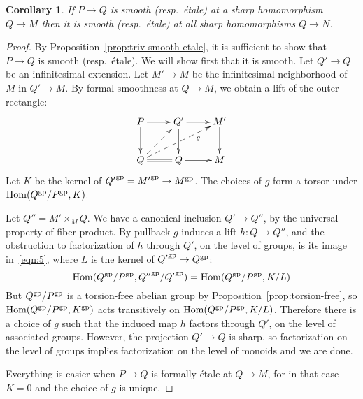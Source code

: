 \documentclass[12pt]{amsart}
\newtheorem{corollary}[theorem]{Corollary}
\theoremstyle{definition}
\theoremstyle{remark}
\def\Hom{\operatorname{Hom}}
\begin{document}
\begin{corollary}
If $P \to Q$ is smooth (resp.\ \'etale) at a sharp homomorphism $Q \to M$ then it is smooth (resp.\ \'etale) at \emph{all} sharp homomorphisms $Q \to N$.
\end{corollary}
\begin{proof}
By Proposition~\ref{prop:triv-smooth-etale}, it is sufficient to show that $P \to Q$ is smooth (resp.\ \'etale).  We will show first that it is smooth.  Let $Q' \to Q$ be an infinitesimal extension.  Let $M' \to M$ be the infinitesimal neighborhood of $M$ in $Q' \to M$.  By formal smoothness at $Q \to M$, we obtain a lift of the outer rectangle:
\begin{equation*} \xymatrix{
P \ar[r] \ar[d] & Q' \ar[r] \ar[d] & M' \ar[d] \\
Q \ar@{-->}[urr]_(.7)g \ar@{-->}[ur] \ar@{=}[r] & Q \ar[r] & M
} \end{equation*}
Let $K$ be the kernel of ${Q'}^{\rm gp} = {M'}^{\rm gp} \to M^{\rm gp}$.  The choices of $g$ form a torsor under $\Hom(Q^{\rm gp}/P^{\rm gp}, K)$.  

Let $Q'' = M' \mathop\times_M Q$.  We have a canonical inclusion $Q' \to Q''$, by the universal property of fiber product.  By pullback $g$ induces a lift $h : Q \to Q''$, and the obstruction to factorization of $h$ through $Q'$, on the level of groups, is its image in~\eqref{eqn:5}, where $L$ is the kernel of ${Q'}^{\rm gp} \to Q^{\rm gp}$:
\begin{equation} \label{eqn:5}
\Hom(Q^{\rm gp}/P^{\rm gp}, {Q''}^{\rm gp} / {Q'}^{\rm gp}) = \Hom(Q^{\rm gp}/P^{\rm gp}, K/L)
\end{equation}
But $Q^{\rm gp} / P^{\rm gp}$ is a torsion-free abelian group by Proposition~\ref{prop:torsion-free}, so $\Hom(Q^{\rm gp}/P^{\rm gp}, K^{\rm gp})$ acts transitively on $\Hom(Q^{\rm gp}/P^{\rm gp}, K/L)$.  Therefore there is a choice of $g$ such that the induced map $h$ factors through $Q'$, on the level of associated groups.  However, the projection $Q' \to Q$ is sharp, so factorization on the level of groups implies factorization on the level of monoids and we are done.

Everything is easier when $P \to Q$ is formally \'etale at $Q \to M$, for in that case $K = 0$ and the choice of $g$ is unique.
\end{proof}
\end{document}
